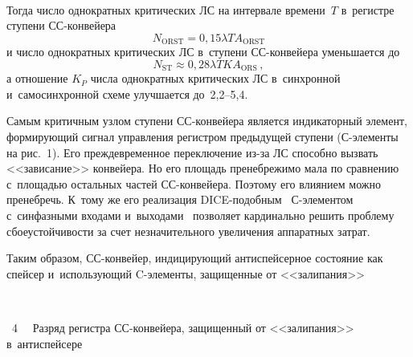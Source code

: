 \begin{multicols}{2}
\setcounter{figure}{2}
\begin{figure*} %
\vspace*{1pt}
\begin{center}  
\mbox{%
\epsfxsize=123.952mm
}
\end{center}
\vspace*{-9pt}
\end{figure*}




  Тогда число однократных критических ЛС на интервале времени~$T$ 
в~регистре ступени СС-кон\-вейера
$$
N_{\mathrm{ORST}} = 0{,}15\lambda TA_{\mathrm{ORST}}
$$
и число однократных критических ЛС в~ступени СС-кон\-вей\-ера уменьшается 
до 
$$
N_{\mathrm{ST}}\approx 0{,}28\lambda TKA_{\mathrm{ORS}}\,,
$$
а отношение $K_P$ числа однократных критических ЛС в~синхронной  
и~самосинхронной схе\-ме улучшается до~2,2--5,4. 

  Самым критичным узлом ступени СС-кон\-вей\-ера является индикаторный 
элемент, фор\-ми\-ру\-ющий сигнал управления регистром предыдущей ступени  
(С-эле\-мен\-ты на рис.~1). Его преждевременное переключение из-за ЛС 
способно вызвать <<зависание>> конвейера. Но его площадь пренебрежимо 
мала по сравнению с~площадью остальных частей СС-кон\-вей\-ера. Поэтому 
его влиянием можно пренебречь. К~тому же его реализация  
DICE-по\-доб\-ным~\cite{7-sok} С-эле\-мен\-том с~синфазными входами 
и~выходами~\cite{5-sok} позволяет кардинально решить проб\-ле\-му 
сбоеустойчивости за счет незначительного увеличения аппаратных затрат.
  
  Таким образом, СС-кон\-вей\-ер, индицирующий антиспейсерное состояние 
как спейсер и~использующий C-эле\-мен\-ты, защищенные от <<залипания>>\linebreak\vspace*{-12pt}

{ \begin{center}  %
 \vspace*{-1pt}
    \mbox{%
\epsfxsize=68.952mm
}

\end{center}

\noindent
{{\figurename~4}\ \ \small{
Разряд регистра СС-конвейера, защищенный от <<залипания>> в~антиспейсере
}}}

\vspace*{9pt}

\setcounter{figure}{1}




\end{multicols}
